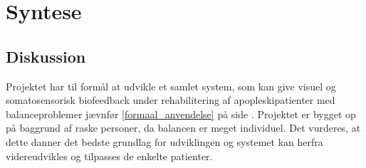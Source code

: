 \chapter{Syntese}
\section{Diskussion}
Projektet har til formål at udvikle et samlet system, som kan give visuel og somatosensorisk biofeedback under rehabilitering af apopleskipatienter med balanceproblemer jævnfør \ref{formaal_anvendelse} på side \pageref{formaal_anvendelse}. Projektet er bygget op på baggrund af raske personer, da balancen er meget individuel. Det vurderes, at dette danner det bedste grundlag for udviklingen og systemet kan herfra videreudvikles og tilpasses de enkelte patienter. 

